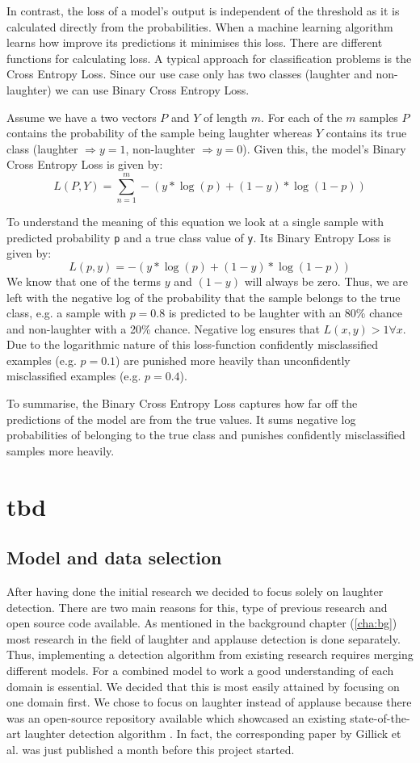 \documentclass[bsc,frontabs,parskip,deptreport]{infthesis}
\begin{document}
In contrast, the loss of a model's output is independent of the threshold as it is calculated directly from the probabilities.
When a machine learning algorithm learns how improve its predictions it minimises this loss. There are different functions for calculating loss.
A typical approach for classification problems is the Cross Entropy Loss. Since our use case only has two classes (laughter and non-laughter) we can use Binary Cross Entropy Loss. 

Assume we have a two vectors $P$ and $Y$ of length $m$. For each of the $m$ samples $P$ contains the probability of the sample being laughter whereas $Y$ contains its true class (laughter $\Rightarrow y=1$, non-laughter $ \Rightarrow y=0$).
Given this, the model's Binary Cross Entropy Loss is given by:
$$ L(P,Y) = \sum_{n=1}^{m}  -{(y*\log(p) + (1 - y)*\log(1 - p))}$$

To understand the meaning of this equation we look at a single sample with predicted probability \texttt{p} and a true class value of \texttt{y}. Its Binary Entropy Loss is given by: 
$$ L(p,y) = -{(y*\log(p) + (1 - y)*\log(1 - p))} $$
We know that one of the terms $y$ and $(1-y)$ will always be zero.
Thus, we are left with the negative log of the probability that the sample belongs to the true class, e.g. a sample with $p=0.8$ is predicted to be laughter with an 80\% chance and non-laughter with a 20\% chance. Negative log ensures that $L(x,y) > 1  \forall x $. 
Due to the logarithmic nature of this loss-function confidently misclassified examples (e.g. $p=0.1$) are punished more heavily than unconfidently misclassified examples (e.g. $p=0.4$).

To summarise, the Binary Cross Entropy Loss captures how far off the predictions of the model are from the true values. It sums negative log probabilities of belonging to the true class and punishes confidently misclassified samples more heavily.

\chapter{tbd} 

\section{Model and data selection}\label{sec:model-and-data}
After having done the initial research we decided to focus solely on laughter detection. 
There are two main reasons for this, type of previous research and open source code available.  
As mentioned in the background chapter (\ref{cha:bg}) most research in the field of laughter and applause detection is done separately. 
Thus, implementing a detection algorithm from existing research requires merging different models. 
For a combined model to work a good understanding of each domain is essential.
We decided that this is most easily attained by focusing on one domain first. 
We chose to focus on laughter instead of applause because there was an open-source repository available which showcased an existing state-of-the-art laughter detection algorithm \citep{gillick-codebase}.
In fact, the corresponding paper by Gillick et al. \citep{gillick2021robust} was just published a month before this project started.
\end{document}
